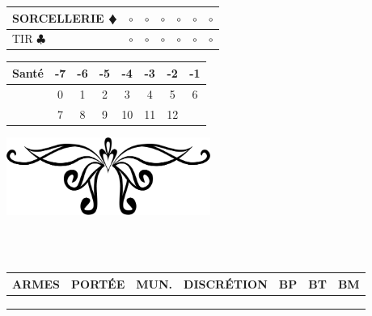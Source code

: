 \documentclass[a5paper,pagesize,french]{book}
\begin{document}
\begin{tabular}[c]{|p{}|p{}|p{}|p{}|p{}|p{}|p{}|}
	SORCELLERIE {\color{red} $\vardiamond$ }			&	$\circ$	&	$\circ$	&	$\circ$	&	$\circ$	&	$\circ$		&	$\circ$		\\ \hline
	TIR { $\clubsuit$ }									&	$\circ$	&	$\circ$	&	$\circ$	&	$\circ$	&	$\circ$		&	$\circ$		\\ \hline
\end{tabular}

\clearpage

\begin{minipage}[ht]{0.48\textwidth}
	\begin{tabular}[c]{|p{}|c|c|c|c|c|c|c|}
		\hline
		\textbf{Santé}	&	-7	&	-6	&	-5	&	-4	&	-3	&	-2	&	-1	\\ \hline
						&	0	&	1	&	2	&	3	&	4	&	5	&	6	\\ \hline
						&	7	&	8	&	9	&	10	&	11	&	12	&		\\ \hline
	\end{tabular}
\end{minipage} \hfill \begin{minipage}[ht]{0.48\textwidth}
	\includegraphics[width=0.50\textwidth]{../../images/artsdecos/ornement06whiteBG.png}
\end{minipage}~\\~\\

\begin{tabular}[c]{|p{}|p{}|p{}|p{}|p{}|p{}|p{}|} 
	\hline
	\textbf{ARMES}	&	PORTÉE	&	MUN.	&	DISCRÉTION	&	BP	&	BT	&	BM	\\
	\hline
					&			&			&				&		&		&		\\
	\hline
					&			&			&				&		&		&		\\
	\hline
					&			&			&				&		&		&		\\
	\hline
\end{tabular}~\\~\\
\end{document}
